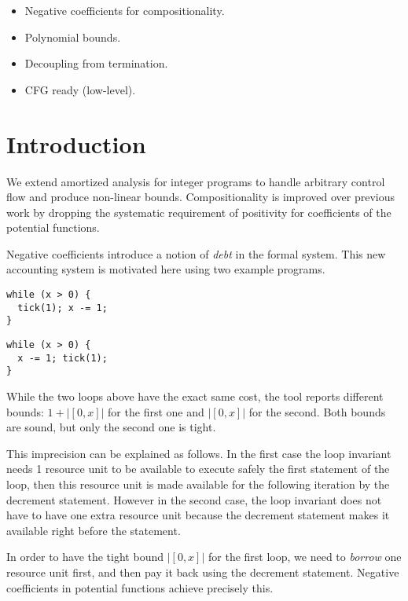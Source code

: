 \documentclass[nocopyrightspace,preprint]{sigplanconf-pldi15}
\begin{document}
\begin{itemize}
\item Negative coefficients for compositionality.
\item Polynomial bounds.
\item Decoupling from termination.
\item CFG ready (low-level).
\end{itemize}

\section{Introduction}

We extend amortized analysis for integer programs to handle
arbitrary control flow and produce non-linear bounds.
Compositionality is improved over previous work by dropping
the systematic requirement of positivity for coefficients
of the potential functions.

Negative coefficients introduce a notion of \emph{debt} in
the formal system. This new accounting system is motivated
here using two example programs.

\begin{minipage}[b]{.45\linewidth}
\begin{lstlisting}
while (x > 0) {
  tick(1); x -= 1;
}
\end{lstlisting}
\end{minipage}
\begin{minipage}[b]{.45\linewidth}
\begin{lstlisting}
while (x > 0) {
  x -= 1; tick(1);
}
\end{lstlisting}
\end{minipage}

While the two loops above have the exact same cost,
the tool \toolname{} reports different bounds: $1 +
|[0,x]|$ for the first one and $|[0,x]|$ for the
second.  Both bounds are sound, but only the second
one is tight.

This imprecision can be explained as follows.  In
the first case the loop invariant
needs 1 resource unit to be available
to execute safely the first  statement of
the loop, then this resource unit is made available
for the following iteration by the decrement statement.
However in the second case, the loop invariant does
not have to have one extra resource unit because
the decrement statement makes it available right
before the  statement.

In order to have the tight bound $|[0,x]|$ for the
first loop, we need to \emph{borrow} one resource
unit first, and then pay it back using the decrement
statement.  Negative coefficients in potential
functions achieve precisely this.
\end{document}
